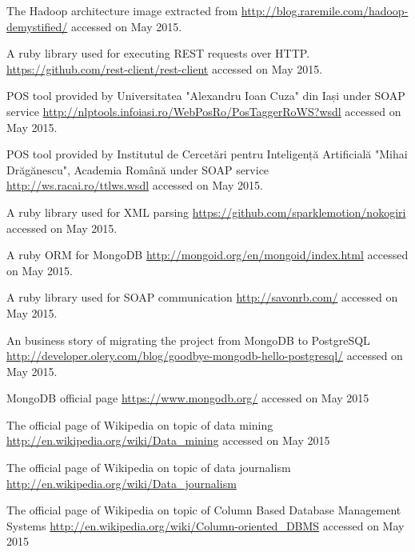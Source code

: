 \begin{thebibliography}{99999}
\singlespace\normalsize

 The Hadoop architecture image extracted from \url{http://blog.raremile.com/hadoop-demystified/} accessed on May 2015.

 A ruby library used for executing REST requests over HTTP. \url{https://github.com/rest-client/rest-client} accessed on May 2015.

 POS tool provided by Universitatea "Alexandru Ioan Cuza" din Iași under SOAP service \url{http://nlptools.infoiasi.ro/WebPosRo/PosTaggerRoWS?wsdl} accessed on May 2015.

 POS tool provided by Institutul de Cercetări pentru Inteligență Artificială "Mihai Drăgănescu", Academia Română under SOAP service \url{http://ws.racai.ro/ttlws.wsdl} accessed on May 2015.

 A ruby library used for XML parsing \url{https://github.com/sparklemotion/nokogiri} accessed on May 2015.

 A ruby ORM for MongoDB \url{http://mongoid.org/en/mongoid/index.html} accessed on May 2015.

 A ruby library used for SOAP communication \url{http://savonrb.com/} accessed on May 2015.

 An business story of migrating the project from MongoDB to PostgreSQL \url{http://developer.olery.com/blog/goodbye-mongodb-hello-postgresql/} accessed on May 2015.

 MongoDB official page \url{https://www.mongodb.org/} accessed on May 2015

 The official page of Wikipedia on topic of data mining \url{http://en.wikipedia.org/wiki/Data_mining} accessed on May 2015



 The official page of Wikipedia on topic of data journalism \url{http://en.wikipedia.org/wiki/Data_journalism}

 The official page of Wikipedia on topic of Column Based Database Management Systems \url{http://en.wikipedia.org/wiki/Column-oriented_DBMS} accessed on May 2015



\end{thebibliography}
